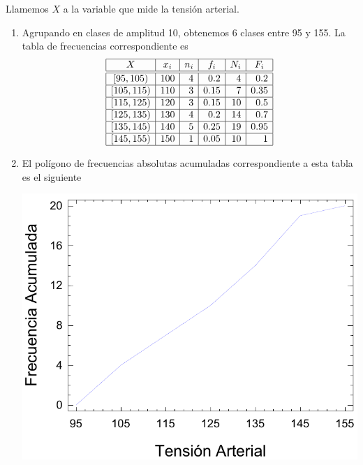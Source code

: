 {Llamemos $X$ a la variable que mide la tensión arterial.
\begin{enumerate}
\item Agrupando en clases de amplitud 10, obtenemos 6 clases entre 95 y 155. La tabla de frecuencias correspondiente es 
\[
\begin{array}{|c|r|r|r|r|r|}
\hline
   X  & \multicolumn{1}{c|}{x_i} & \multicolumn{1}{c|}{n_i} & \multicolumn{1}{c|}{f_i} & \multicolumn{1}{c|}{N_i} & \multicolumn{1}{c|}{F_i}\\
\hline\hline
  [95,105)  &  100  &   4       & 0.2 & 4 & 0.2\\
\hline
 [105,115)  &  110 &    3       & 0.15 & 7 & 0.35 \\
\hline
 [115,125) &  120 &    3       & 0.15 &  10 & 0.5\\
\hline
 [125,135) &  130 &    4       & 0.2 & 14 & 0.7\\
\hline
 [135,145) &  140 &    5       & 0.25 & 19 & 0.95\\
\hline
 [145,155) &  150 &     1       & 0.05 & 10 & 1\\
\hline
\end{array}
\]

\item El polígono de frecuencias absolutas acumuladas correspondiente a esta tabla es el siguiente
\begin{center}
\includegraphics[scale=0.6]{img/poligono-tension-des-37}
\end{center}


\end{enumerate}}
